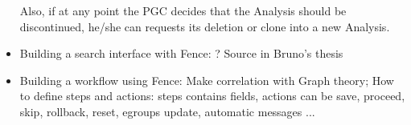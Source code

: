 \begin{itemize}
Also, if at any point the PGC decides that the Analysis should be discontinued, he/she can requests its deletion or clone into a new Analysis.

\item Building a search interface with Fence: ?
Source in Bruno's thesis

\item Building a workflow using Fence:
Make correlation with Graph theory;
How to define steps and actions: steps contains fields, actions can be save, proceed, skip, rollback, reset, egroups update, automatic messages ...

\end{itemize}
